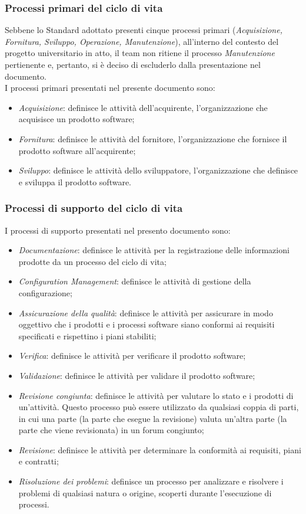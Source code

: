 \documentclass[10pt, a4paper]{article}
\begin{document}
\subsubsection{Processi primari del ciclo di vita}
Sebbene lo Standard adottato presenti cinque processi primari (\textit{Acquisizione, Fornitura, Sviluppo, Operazione, Manutenzione}),
all'interno del contesto del progetto universitario in atto, il team non ritiene il processo \textit{Manutenzione} pertienente e, pertanto, 
si è deciso di escluderlo dalla presentazione nel documento.\\
I processi primari presentati nel presente documento sono:
\begin{itemize}
    \item \textit{Acquisizione}: definisce le attività dell'acquirente, l'organizzazione che acquisisce un prodotto software;
    \item \textit{Fornitura}: definisce le attività del fornitore, l'organizzazione che fornisce il prodotto software all'acquirente;
    \item \textit{Sviluppo}: definisce le attività dello sviluppatore, l'organizzazione che definisce e sviluppa il prodotto software.
\end{itemize}

\subsubsection{Processi di supporto del ciclo di vita}
I processi di supporto presentati nel presento documento sono:
\begin{itemize}
    \item \textit{Documentazione}: definisce le attività per la registrazione delle informazioni prodotte da un processo del ciclo di vita;
    \item \textit{Configuration Management}: definisce le attività di gestione della configurazione;
    \item \textit{Assicurazione della qualità}: definisce le attività per assicurare in modo oggettivo che i prodotti e i processi software
    siano conformi ai requisiti specificati e rispettino i piani stabiliti;
    \item \textit{Verifica}: definisce le attività per verificare il prodotto software;
    \item \textit{Validazione}: definisce le attività per validare il prodotto software;
    \item \textit{Revisione congiunta}: definisce le attività per valutare lo stato e i prodotti di un'attività. Questo processo può essere 
    utilizzato da qualsiasi coppia di parti, in cui una parte (la parte che esegue la revisione) valuta un'altra parte (la parte che viene revisionata)
    in un forum congiunto;
    \item \textit{Revisione}: definisce le attività per determinare la conformità ai requisiti, piani e contratti;
    \item \textit{Risoluzione dei problemi}: definisce un processo per analizzare e risolvere i problemi di qualsiasi natura o origine, scoperti
    durante l'esecuzione di processi.
\end{itemize}
\end{document}
